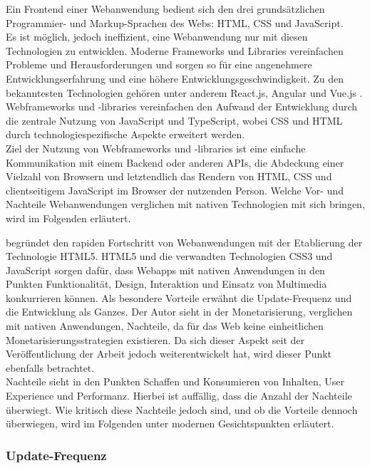 \documentclass[a4paper]{scrartcl}
\begin{document}
Ein Frontend einer Webanwendung bedient sich den drei grundsätzlichen Programmier- und Markup-Sprachen des Webs: HTML, CSS und JavaScript. \\
Es ist möglich, jedoch ineffizient, eine Webanwendung nur mit diesen Technologien zu entwicklen. Moderne Frameworks und Libraries vereinfachen Probleme und Herausforderungen und sorgen so für eine angenehmere Entwicklungserfahrung und eine höhere Entwicklungsgeschwindigkeit. Zu den bekanntesten Technologien gehören unter anderem React.js, Angular und Vue.js \autocite{Clement}. Webframeworks und -libraries vereinfachen den Aufwand der Entwicklung durch die zentrale Nutzung von JavaScript und TypeScript, wobei CSS und HTML durch technologiespezifische Aspekte erweitert werden. \\
Ziel der Nutzung von Webframeworks und -libraries ist eine einfache Kommunikation mit einem Backend oder anderen APIs, die Abdeckung einer Vielzahl von Browsern und letztendlich das Rendern von HTML, CSS und clientseitigem JavaScript im Browser der nutzenden Person. Welche Vor- und Nachteile Webanwendungen verglichen mit nativen Technologien mit sich bringen, wird im Folgenden erläutert.

\textcite[27]{Jobe} begründet den rapiden Fortschritt von Webanwendungen mit der Etablierung der Technologie HTML5. HTML5 und die verwandten Technologien CSS3 und JavaScript sorgen dafür, dass Webapps mit nativen Anwendungen in den Punkten Funktionalität, Design, Interaktion und Einsatz von Multimedia konkurrieren können. Als besondere Vorteile erwähnt \textcite[28]{Jobe} die Update-Frequenz und die Entwicklung als Ganzes. Der Autor sieht in der Monetarisierung, verglichen mit nativen Anwendungen, Nachteile, da für das Web keine einheitlichen Monetarisierungsstrategien existieren. Da sich dieser Aspekt seit der Veröffentlichung der Arbeit jedoch weiterentwickelt hat, wird dieser Punkt ebenfalls betrachtet. \\
Nachteile sieht \textcite[28]{Jobe} in den Punkten Schaffen und Konsumieren von Inhalten, User Experience und Performanz. Hierbei ist auffällig, dass die Anzahl der Nachteile überwiegt. Wie kritisch diese Nachteile jedoch sind, und ob die Vorteile dennoch überwiegen, wird im Folgenden unter modernen Gesichtspunkten erläutert. \\

\subsubsection{Update-Frequenz}
\end{document}

